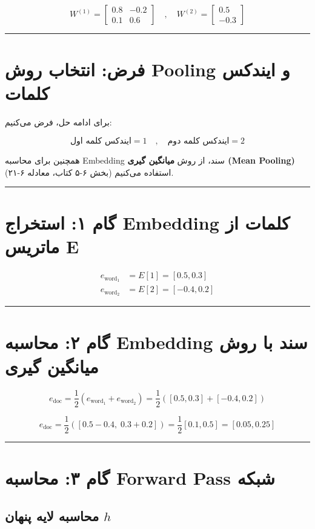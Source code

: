 \documentclass[11pt,a4paper]{article}
\newcommand{\en}[1]{\textenglish{#1}}
\newcommand{\separator}{\vspace{1em}\noindent\rule{\linewidth}{0.4pt}\vspace{1em}}
\begin{document}
\[
W^{(1)} = 
\begin{bmatrix}
0.8 & -0.2 \\
0.1 & 0.6
\end{bmatrix}
\quad,\quad
W^{(2)} = 
\begin{bmatrix}
0.5 \\
-0.3
\end{bmatrix}
\]

\separator
\section{فرض: انتخاب روش \en{Pooling} و ایندکس کلمات}

برای ادامه حل، فرض می‌کنیم:

\[
\text{ایندکس کلمه اول} = 1 \quad,\quad \text{ایندکس کلمه دوم} = 2
\]

همچنین برای محاسبه \en{Embedding} سند، از روش \textbf{میانگین گیری (\en{Mean Pooling})} استفاده می‌کنیم (بخش \en{۶-۵} کتاب، معادله \en{۶-۲۱}).

\separator
\section{گام ۱: استخراج \en{Embedding} کلمات از ماتریس E}

\begin{align*}
e_{\text{word}_1} &= E[1] = [0.5, 0.3] \\
e_{\text{word}_2} &= E[2] = [-0.4, 0.2]
\end{align*}

\separator
\section{گام ۲: محاسبه \en{Embedding} سند با روش میانگین گیری}

\[
e_{\text{doc}} = \frac{1}{2} \left( e_{\text{word}_1} + e_{\text{word}_2} \right) = \frac{1}{2} \left( [0.5, 0.3] + [-0.4, 0.2] \right)
\]

\[
e_{\text{doc}} = \frac{1}{2} \left( [0.5 - 0.4,\; 0.3 + 0.2] \right) = \frac{1}{2} [0.1, 0.5] = [0.05, 0.25]
\]

\separator
\section{گام ۳: محاسبه \en{Forward Pass} شبکه}

\subsection{محاسبه لایه پنهان \(h\)}
\end{document}
